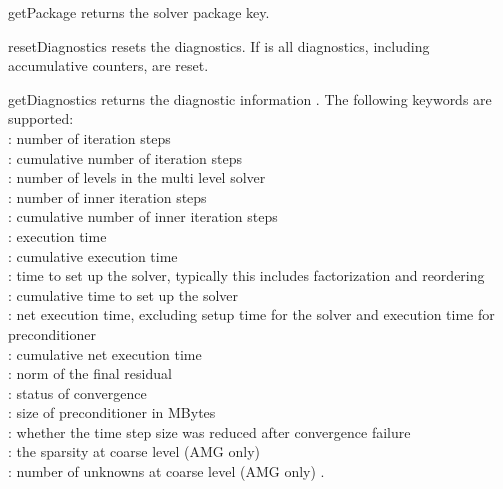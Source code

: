 \begin{methoddesc}[SolverOptions]{getPackage}{}
returns the solver package key.
\end{methoddesc}

\begin{methoddesc}[SolverOptions]{resetDiagnostics}{}
resets the diagnostics. If  is \True all diagnostics, including
accumulative counters, are reset.
\end{methoddesc}

\begin{methoddesc}[SolverOptions]{getDiagnostics}{}
returns the diagnostic information . The following keywords are
supported:\\
 : number of iteration steps\\
 : cumulative number of iteration steps\\
 : number of levels in the multi level solver\\
 : number of inner iteration steps\\
 : cumulative number of inner iteration steps\\
 : execution time\\
 : cumulative execution time\\
 : time to set up the solver, typically this includes
 factorization and reordering\\
 : cumulative time to set up the solver\\
 : net execution time, excluding setup time for the solver
 and execution time for preconditioner\\
 : cumulative net execution time\\
 : norm of the final residual\\
 : status of convergence\\
 : size of preconditioner in MBytes \\
 : whether the time step size was reduced after convergence failure \\
 : the sparsity at coarse level (AMG only) \\
 : number of unknowns at coarse level (AMG only) .
 
\end{methoddesc}

